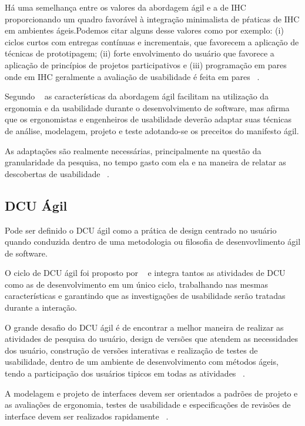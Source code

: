 	Há uma semelhança entre os valores da abordagem ágil e a de IHC proporcionando um quadro favorável à integração minimalista de pŕaticas de IHC em ambientes ágeis.Podemos citar alguns desse valores como por exemplo: (i) ciclos curtos com entregas contínuas e incrementais, que favorecem a aplicação de técnicas de prototipagem; (ii) forte envolvimento do usuário que favorece a aplicação de princípios de projetos participativos e (iii) programação em pares onde em IHC geralmente a avaliação de usabilidade é feita em pares ~\cite{barbosa2008estrategia}. 

	Segundo ~ as características da abordagem ágil facilitam na utilização da ergonomia e da usabilidade durante o desenvolvimento de software, mas afirma que os ergonomistas e engenheiros de usabilidade deverão adaptar suas técnicas de análise, modelagem, projeto e teste adotando-se os preceitos do manifesto ágil.
	
	As adaptações são realmente necessárias, principalmente na questão da granularidade da pesquisa, no tempo gasto com ela e na maneira de relatar as descobertas de usabilidade ~\cite{santos2012}.

\subsection{DCU Ágil}


        Pode ser definido o DCU ágil como a prática de design centrado no usuário quando conduzida dentro de uma metodologia ou filosofia de desenvovlimento ágil de software.~\cite{santos2012}

	O ciclo de DCU ágil foi proposto por ~ e integra tantos as atividades de DCU como as de desenvolvimento em um único ciclo, trabalhando nas mesmas características e garantindo que as investigações de usabilidade serão tratadas durante a interação.



	
	O grande desafio do DCU ágil é de encontrar a melhor maneira de realizar as atividades de pesquisa do usuário, design de versões que atendem as necessidades dos usuário, construção de versões interativas e realização de testes de usabilidade, dentro de um ambiente de desenvolvimento com métodos ágeis, tendo a participação dos usuários tipicos em todas as atividades ~\cite{santos2012}.%
	
        A modelagem e projeto de interfaces devem ser orientados a padrões de projeto e as avaliações de ergonomia, testes de usabilidade e especificações de revisões de interface devem ser realizados rapidamente ~\cite{cybis2010}.
	
